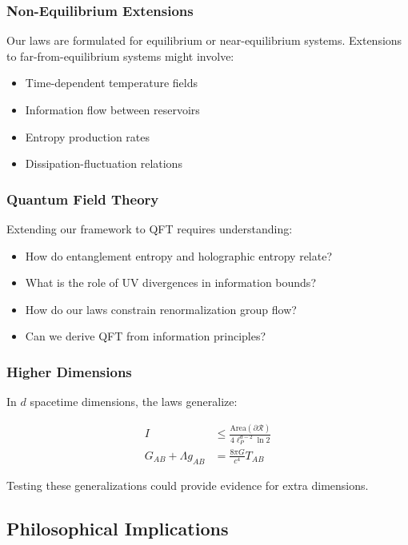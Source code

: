 \documentclass[11pt,a4paper]{article}
\theoremstyle{plain}
\theoremstyle{definition}
\theoremstyle{remark}
\begin{document}
\subsubsection{Non-Equilibrium Extensions}

Our laws are formulated for equilibrium or near-equilibrium systems. Extensions to far-from-equilibrium systems might involve:

\begin{itemize}[leftmargin=*]
\item Time-dependent temperature fields
\item Information flow between reservoirs
\item Entropy production rates
\item Dissipation-fluctuation relations
\end{itemize}

\subsubsection{Quantum Field Theory}

Extending our framework to QFT requires understanding:

\begin{itemize}[leftmargin=*]
\item How do entanglement entropy and holographic entropy relate?
\item What is the role of UV divergences in information bounds?
\item How do our laws constrain renormalization group flow?
\item Can we derive QFT from information principles?
\end{itemize}

\subsubsection{Higher Dimensions}

In $d$ spacetime dimensions, the laws generalize:

\begin{align}
I &\leq \frac{\text{Area}(\partial\mathcal{R})}{4\ell_P^{d-2}\ln 2} \\
G_{AB} + \Lambda g_{AB} &= \frac{8\pi G}{c^4}T_{AB}
\end{align}

Testing these generalizations could provide evidence for extra dimensions.

\subsection{Philosophical Implications}
\end{document}
